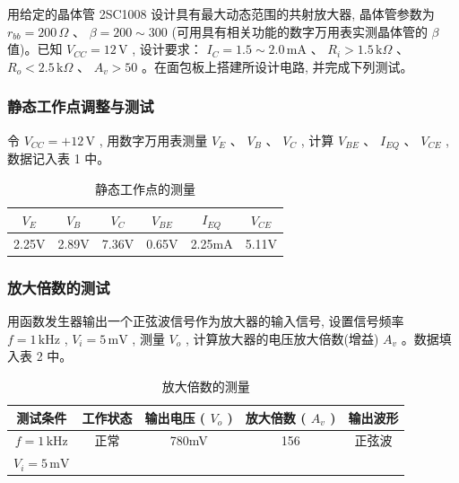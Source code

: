 \documentclass[10pt, a4paper]{article} %
\begin{document}
用给定的晶体管 2SC1008 设计具有最大动态范围的共射放大器, 晶体管参数为  $ r_{bb} = 200 \, \Omega $ 、 $ \beta = 200 \sim 300 $ (可用具有相关功能的数字万用表实测晶体管的  $ \beta $  值)。已知  $ V_{CC} = 12 \, \text{V} $ , 设计要求： $ I_C = 1.5 \sim 2.0 \, \text{mA} $ 、 $ R_i > 1.5 \, \text{k}\Omega $ 、 $ R_o < 2.5 \, \text{k}\Omega $ 、 $ A_v > 50 $ 。在面包板上搭建所设计电路, 并完成下列测试。

\subsubsection{静态工作点调整与测试}

令  $ V_{CC} = +12 \, \text{V} $ , 用数字万用表测量  $ V_E $ 、 $ V_B $ 、 $ V_C $ , 计算  $ V_{BE} $ 、 $ I_{EQ} $ 、 $ V_{CE} $ , 数据记入表 1 中。

\begin{table}[ht]
    \centering
    \caption{静态工作点的测量}
    \begin{tabular}{c|c|c|c|c|c}
        \toprule
         $ V_E $  &  $ V_B $  &  $ V_C $  &  $ V_{BE} $  &  $ I_{EQ} $  &  $ V_{CE} $  \\
        \midrule
        2.25V&2.89V&7.36V&0.65V&2.25mA&5.11V\\
        \bottomrule
    \end{tabular}
\end{table}

\subsubsection{放大倍数的测试}

用函数发生器输出一个正弦波信号作为放大器的输入信号, 设置信号频率  $ f = 1 \, \text{kHz} $ ,  $ V_i = 5 \, \text{mV} $ , 测量  $ V_o $ , 计算放大器的电压放大倍数(增益) $ A_v $ 。数据填入表 2 中。

\begin{table}[ht]
    \centering
    \caption{放大倍数的测量}
    \begin{tabular}{c|c|c|c|c}
        \toprule
        测试条件 & 工作状态 & 输出电压 ( $ V_o $ ) & 放大倍数 ( $ A_v $ ) & 输出波形 \\
        \midrule
         $ f = 1 \, \text{kHz} $  & 正常 &780mV&156&正弦波\\
         $ V_i = 5 \, \text{mV} $  & & & & \\
        \bottomrule
    \end{tabular}
\end{table}
\end{document}
